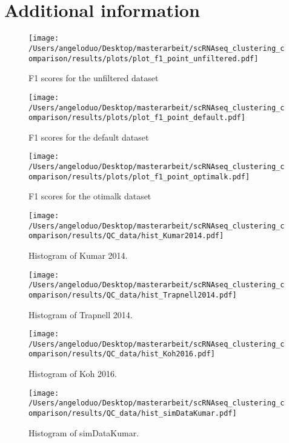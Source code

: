 \documentclass[11pt, a4paper]{article}\usepackage[]{graphicx}\usepackage[]{color}
\begin{document}


\appendix 
\section{\\Additional information}

\begin{figure}[!h]
\texttt{[image: /Users/angeloduo/Desktop/masterarbeit/scRNAseq\_clustering\_comparison/results/plots/plot\_f1\_point\_unfiltered.pdf]}
\caption{F1 scores for the unfiltered  dataset }
\label{fig:f1pointunf}
\end{figure}

\begin{figure}[!h]
\texttt{[image: /Users/angeloduo/Desktop/masterarbeit/scRNAseq\_clustering\_comparison/results/plots/plot\_f1\_point\_default.pdf]}
\caption{F1 scores for the default  dataset }
\label{fig:f1pointunf}
\end{figure}

\begin{figure}[!h]
\texttt{[image: /Users/angeloduo/Desktop/masterarbeit/scRNAseq\_clustering\_comparison/results/plots/plot\_f1\_point\_optimalk.pdf]}
\caption{F1 scores for the otimalk  dataset }
\label{fig:f1pointunf}
\end{figure}

\begin{figure}[!h]
\texttt{[image: /Users/angeloduo/Desktop/masterarbeit/scRNAseq\_clustering\_comparison/results/QC\_data/hist\_Kumar2014.pdf]}
\caption{Histogram of Kumar 2014.}
\label{fig:histkumar}
\end{figure}

\begin{figure}[!h]
\texttt{[image: /Users/angeloduo/Desktop/masterarbeit/scRNAseq\_clustering\_comparison/results/QC\_data/hist\_Trapnell2014.pdf]}
\caption{Histogram of Trapnell 2014. }
\label{fig:histtrap}
\end{figure}

\begin{figure}[!h]
\texttt{[image: /Users/angeloduo/Desktop/masterarbeit/scRNAseq\_clustering\_comparison/results/QC\_data/hist\_Koh2016.pdf]}
\caption{Histogram of Koh 2016. }
\label{fig:histkoh}
\end{figure}


\begin{figure}[!h]
\texttt{[image: /Users/angeloduo/Desktop/masterarbeit/scRNAseq\_clustering\_comparison/results/QC\_data/hist\_simDataKumar.pdf]}
\caption{Histogram of simDataKumar. }
\label{fig:histsim}
\end{figure}
\end{document}
